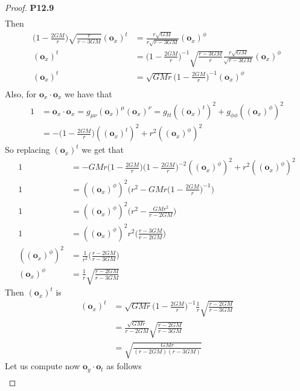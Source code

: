 \documentclass[11pt]{article}
\theoremstyle{definition}
\begin{document}
\begin{proof}{\textbf{P12.9}}
\begin{align*}
    \end{align*}
    Then
    \begin{align*}
        \bigg(1 - \frac{2GM}{r}\bigg)\sqrt{\frac{r}{r - 3GM}} (\bm{o}_x)^t
        &= \frac{r\sqrt{GM}}{r\sqrt{r - 3GM}} (\bm{o}_x)^\phi\\
        (\bm{o}_x)^t
        &= \bigg(1 - \frac{2GM}{r}\bigg)^{-1}\sqrt{\frac{r - 3GM}{r}}
        \frac{r\sqrt{GM}}{\sqrt{r - 3GM}} (\bm{o}_x)^\phi\\
        (\bm{o}_x)^t &= \sqrt{GMr}\bigg(1 - \frac{2GM}{r}\bigg)^{-1}(\bm{o}_x)^\phi\\
    \end{align*}
    Also, for $\bm{o}_x \cdot \bm{o}_x$ we have that
    \begin{align*}
        1 &= \bm{o}_x \cdot \bm{o}_x
        = g_{\mu\nu} (\bm{o}_x)^\mu (\bm{o}_x)^\nu
        = g_{tt} ((\bm{o}_x)^t)^2 + g_{\phi\phi} ((\bm{o}_x)^\phi)^2\\
        &= -\bigg(1 - \frac{2GM}{r}\bigg) ((\bm{o}_x)^t)^2
        + r^2 ((\bm{o}_x)^\phi)^2
    \end{align*}
    So replacing $(\bm{o}_x)^t$ we get that
    \begin{align*}
        1 &= -GMr\bigg(1 - \frac{2GM}{r}\bigg)\bigg(1 - \frac{2GM}{r}\bigg)^{-2}
        ((\bm{o}_x)^\phi)^2 + r^2 ((\bm{o}_x)^\phi)^2\\
        1 &= ((\bm{o}_x)^\phi)^2\bigg(r^2-GMr\bigg(1 - \frac{2GM}{r}\bigg)^{-1}\bigg)\\
        1 &= ((\bm{o}_x)^\phi)^2\bigg(r^2-\frac{GMr^2}{r - 2GM}\bigg)\\
        1 &= ((\bm{o}_x)^\phi)^2r^2\bigg(\frac{r - 3GM}{r - 2GM}\bigg)\\
        ((\bm{o}_x)^\phi)^2 &= \frac{1}{r^2}\bigg(\frac{r - 2GM}{r - 3GM}\bigg)\\
        (\bm{o}_x)^\phi &= \frac{1}{r}\sqrt{\frac{r - 2GM}{r - 3GM}}
    \end{align*}
    Then $(\bm{o}_x)^t$ is 
    \begin{align*}
        (\bm{o}_x)^t
        &= \sqrt{GMr}\bigg(1 - \frac{2GM}{r}\bigg)^{-1}
        \frac{1}{r}\sqrt{\frac{r - 2GM}{r - 3GM}}\\
        &= \frac{\sqrt{GMr}}{r - 2GM}\sqrt{\frac{r - 2GM}{r - 3GM}}\\
        &= \sqrt{\frac{GMr}{(r - 2GM)(r - 3GM)}}
    \end{align*}
    Let us compute now $\bm{o}_y\cdot \bm{o}_t$ as follows
    \begin{align*}

\end{align*}
\end{proof}
\end{document}
